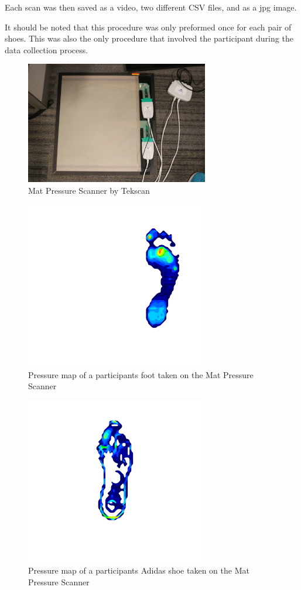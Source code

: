    Each scan was then saved as a video, two different CSV files, and as a jpg image. 
   
   It should be noted that this procedure was only preformed once for each pair of shoes. This was also the only procedure that involved the participant during the data collection process. 

\begin{figure}[!htp]
\centering
\includegraphics[width=8cm]{Mat_Scanner}
\caption{Mat Pressure Scanner by Tekscan }
\label{Image 1}
\end{figure}


\begin{figure}[!htp]
\centering
\includegraphics[width=8cm]{Mat_Foot}
\caption{Pressure map of a participants foot taken on the Mat Pressure Scanner}
\label{Image 2}
\end{figure}

\begin{figure}[!htp]
\centering
\includegraphics[width=8cm]{Mat_shoe}
\caption{Pressure map of a participants Adidas shoe taken on the Mat Pressure Scanner }
\label{Image 3}
\end{figure}

